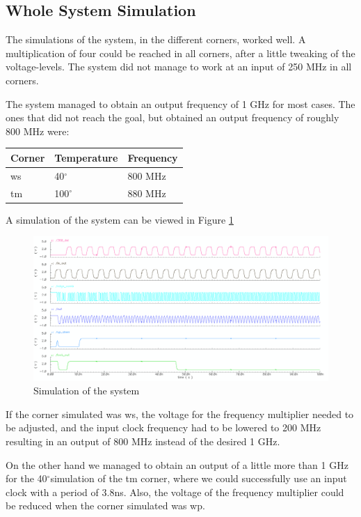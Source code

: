 \documentclass[a4paper,12pt]{article} \usepackage{graphicx}
\newcommand{\degree}{\ensuremath{^\circ}}
\begin{document}
\subsection{Whole System Simulation}
The simulations of the system, in the different corners, worked well. A multiplication
of four could be reached in all corners, after a little tweaking of the voltage-levels.
The system did not manage to work at an input of 250 MHz in all corners.

The system managed to obtain an output frequency of 1 GHz for most cases. The ones that
did not reach the goal, but obtained an output frequency of roughly 800 MHz were:

\begin{tabular}{l l l}
Corner & Temperature & Frequency\\ \hline
ws & 40\degree & 800 MHz\\
tm & 100\degree & 880 MHz
\end{tabular}

A simulation of the system can be viewed in Figure \ref{fig:sim_system}
\begin{figure}[h]
\centering
\includegraphics[width=\textwidth]{../Bilder/Layout/simulation_system.png}
\caption{Simulation of the system}
\label{fig:sim_system}
\end{figure}

If the corner simulated was ws, the voltage for the frequency multiplier
needed to be adjusted, and the input clock frequency had to be lowered 
to 200 MHz resulting in an output of 800 MHz instead of the desired 1 GHz.

On the other hand we managed to obtain an output of a little more than 1 GHz for
the 40\degree simulation of the tm corner, where we could successfully use an 
input clock with a period of 3.8ns.
Also, the voltage of the frequency multiplier could be reduced when the corner simulated was wp.
\end{document}

